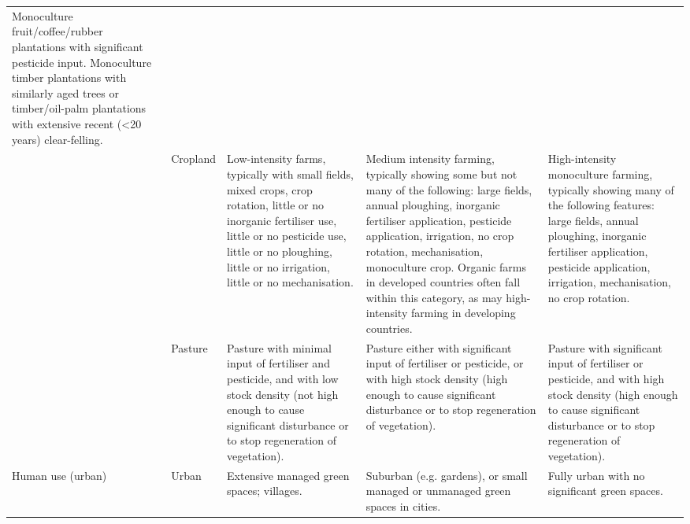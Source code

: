 \begin{landscape}
\begin{table}[htb]
\begin{tabularx}{1.5\textwidth}{YlYYY}
  Monoculture fruit/coffee/rubber plantations with significant pesticide input. Monoculture timber plantations with similarly aged trees or timber/oil-palm plantations with extensive recent (\textless 20 years) clear-felling. \\
 &
  Cropland &
  Low-intensity farms, typically with small fields, mixed crops, crop rotation, little or no inorganic fertiliser use, little or no pesticide use, little or no ploughing, little or no irrigation, little or no mechanisation. &
  Medium intensity farming, typically showing some but not many of the following: large fields, annual ploughing, inorganic fertiliser application, pesticide application, irrigation, no crop rotation, mechanisation, monoculture crop. Organic farms in developed countries often fall within this category, as may high- intensity farming in developing countries. &
  High-intensity monoculture farming, typically showing many of the following features: large fields, annual ploughing, inorganic fertiliser application, pesticide application, irrigation, mechanisation, no crop rotation. \\
 &
  Pasture &
  Pasture with minimal input of fertiliser and pesticide, and with low stock density (not high enough to cause significant disturbance or to stop regeneration of vegetation). &
  Pasture either with significant input of fertiliser or pesticide, or with high stock density (high enough to cause significant disturbance or to stop regeneration of vegetation). &
  Pasture with significant input of fertiliser or pesticide, and with high stock density (high enough to cause significant disturbance or to stop regeneration of vegetation). \\
Human use (urban) &
  Urban &
  Extensive managed green spaces; villages. &
  Suburban (e.g. gardens), or small managed or unmanaged green spaces in cities. &
  Fully urban with no significant green spaces.\\
  \bottomrule
\end{tabularx}
\end{table}
\end{landscape}


